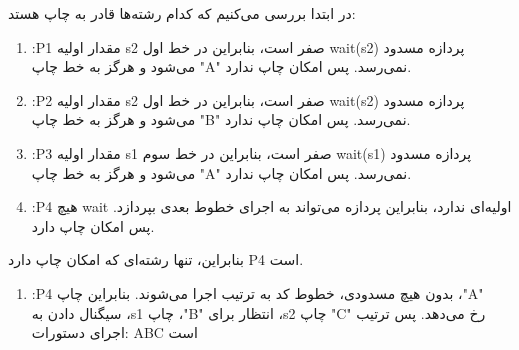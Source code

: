 \begin{qsolve}
	
در ابتدا بررسی می‌کنیم که کدام رشته‌ها قادر به چاپ هستد:

\begin{enumerate}
	\item :P1 مقدار اولیه s2 صفر است، بنابراین در خط اول wait(s2) پردازه مسدود می‌شود و هرگز به خط چاپ "A" نمی‌رسد. پس امکان چاپ ندارد.
	
	\item :P2 مقدار اولیه s2 صفر است، بنابراین در خط اول wait(s2) پردازه مسدود می‌شود و هرگز به خط چاپ "B" نمی‌رسد. پس امکان چاپ ندارد.
	
	\item :P3 مقدار اولیه s1 صفر است، بنابراین در خط سوم wait(s1) پردازه مسدود می‌شود و هرگز به خط چاپ "A" نمی‌رسد. پس امکان چاپ ندارد.
	
	\item :P4 هیچ wait اولیه‌ای ندارد، بنابراین پردازه می‌تواند به اجرای خطوط بعدی بپردازد. پس امکان چاپ دارد.
\end{enumerate}

بنابراین، تنها رشته‌ای که امکان چاپ دارد P4 است.

\begin{enumerate}
	\item 
	:P4 بدون هیچ مسدودی، خطوط کد به ترتیب اجرا می‌شوند. بنابراین چاپ ،"A" سیگنال دادن به ،s1 چاپ ،"B" انتظار برای ،s2 چاپ "C" رخ می‌دهد. پس ترتیب اجرای دستورات: ABC است
	
\end{enumerate}



	
\end{qsolve}


